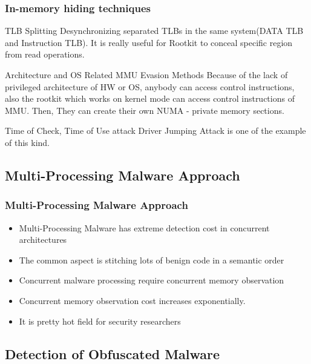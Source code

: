 \documentclass{beamer}
\begin{document}
\begin{frame}
	\frametitle{In-memory hiding techniques}
	\begin{block}{TLB Splitting}
		Desynchronizing separated TLBs in the same system(DATA TLB and Instruction TLB). It is really useful for Rootkit to conceal specific region from read operations. 
	\end{block}

	\begin{block}{Architecture and OS Related MMU Evasion Methods}
		\small{Because of the lack of privileged architecture of HW or OS, anybody can access control instructions, also the rootkit which works on kernel mode can access control instructions of MMU. Then, They can create their own NUMA - private memory sections. }
	\end{block}

	\begin{block}{Time of Check, Time of Use attack}
		Driver Jumping Attack is one of the example of this kind.
	\end{block}
\end{frame}


\subsection{Multi-Processing Malware Approach}
\begin{frame}
	\frametitle{Multi-Processing Malware Approach}
	\begin{itemize}
		\item Multi-Processing Malware has extreme detection cost in concurrent architectures
		\item The common aspect is stitching lots of benign code in a semantic order
		\item Concurrent malware processing require concurrent memory observation
		\item Concurrent memory observation cost increases exponentially.
		\item It is pretty hot field for security researchers
	\end{itemize}
\end{frame}

\subsection{Detection of Obfuscated Malware}
\end{document}
